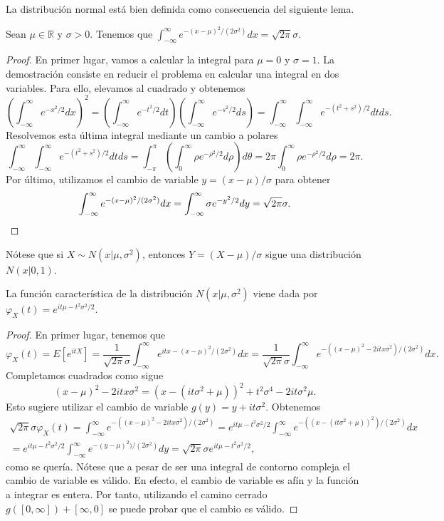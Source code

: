 \documentclass{article}
\begin{document}
La distribución normal está bien definida como consecuencia del siguiente lema.
\begin{lem}
    Sean $\mu \in \mathbb{R}$ y $\sigma > 0$. Tenemos que $\int_{-\infty}^\infty e^{-(x-\mu)^2 / (2\sigma^2)}dx = \sqrt{2\pi}\sigma.$
\end{lem}
\begin{proof}
    En primer lugar, vamos a calcular la integral para $\mu = 0$ y $\sigma = 1$. La demostración consiste en reducir el problema en calcular una integral en dos variables. Para ello, elevamos al cuadrado y obtenemos
    \[\left(\int_{-\infty}^\infty e^{-x^2 / 2}dx\right)^2 = \left(\int_{-\infty}^\infty e^{-t^2 / 2}dt\right) \left(\int_{-\infty}^\infty e^{-s^2 / 2}ds \right) = \int_{-\infty}^\infty \int_{-\infty}^\infty e^{-(t^2+s^2) / 2} dt ds. \]
    Resolvemos esta última integral mediante un cambio a polares
    \[\int_{-\infty}^\infty \int_{-\infty}^\infty e^{-(t^2+s^2) / 2} dt ds = \int_{-\pi}^\pi \left(\int_{0}^\infty \rho e^{-\rho^2 / 2} d\rho \right) d\theta = 2\pi \int_{0}^\infty \rho e^{-\rho^2 / 2} d\rho = 2\pi.\]
    Por último, utilizamos el cambio de variable $y = (x - \mu) / \sigma$ para obtener
    \[\int_{-\infty}^\infty e^{-(x-\mu)^2 / (2\sigma^2)}dx = \int_{-\infty}^\infty \sigma e^{-y^2 / 2}dy = \sqrt{2\pi}\sigma. \qedhere\]
\end{proof}

Nótese que si $X \sim N(x | \mu, \sigma^2)$, entonces $Y = (X - \mu)/\sigma$ sigue una distribución $N(x|0,1)$.

\begin{prop} \label{prop:normal:cf}
    La función característica de la distribución $N(x|\mu, \sigma^2)$ viene dada por $\varphi_X(t) = e^{it\mu - t^2 \sigma^2 / 2}$.
\end{prop}
\begin{proof}
    En primer lugar, tenemos que
    \[\varphi_X(t) = E[e^{itX}] = \frac{1}{\sqrt{2\pi}\sigma} \int_{-\infty}^{\infty} e^{itx-(x-\mu)^2 / (2\sigma^2)} dx = \frac{1}{\sqrt{2\pi}\sigma} \int_{-\infty}^{\infty} e^{-((x-\mu)^2 - 2itx\sigma^2) / (2\sigma^2)} dx.\]
    Completamos cuadrados como sigue
    \[(x-\mu)^2 - 2 itx\sigma^2 = (x - (it \sigma^2 + \mu))^2 + t^2 \sigma^4 - 2it\sigma^2 \mu.\]
    Esto sugiere utilizar el cambio de variable $g(y) = y + it \sigma^2$. Obtenemos
    \begin{align*}
        \sqrt{2\pi}\sigma \varphi_X(t) = \int_{-\infty}^{\infty} e^{-((x-\mu)^2 - 2itx\sigma^2) / (2\sigma^2)} = e^{it\mu - t^2 \sigma^2 / 2} \int_{-\infty}^{\infty} e^{-((x-(it \sigma^2 + \mu))^2 ) / (2\sigma^2)} dx \\
        = e^{it\mu - t^2 \sigma^2 / 2} \int_{-\infty}^{\infty} e^{-(y - \mu)^2 ) / (2\sigma^2)} dy = \sqrt{2\pi}\sigma e^{it\mu - t^2 \sigma^2 / 2},
    \end{align*}
    como se quería.
    Nótese que a pesar de ser una integral de contorno compleja el cambio de variable es válido. En efecto, el cambio de variable es afín y la función a integrar es entera. Por tanto, utilizando el camino cerrado $g([0, \infty]) + [\infty, 0]$ se puede probar que el cambio es válido.
\end{proof}
\end{document}
